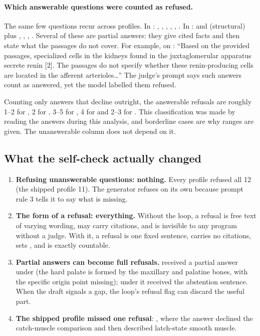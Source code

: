 \paragraph{Which answerable questions were counted as refused.} The same few questions recur across profiles. In : , , , , , . In :  and  (structural) plus , , , . Several of these are partial answers: they give cited facts and then state what the passages do not cover. For example,  on : \enquote{Based on the provided passages, specialized cells in the kidneys found in the juxtaglomerular apparatus secrete renin [2]. The passages do not specify whether these renin-producing cells are located in the afferent arterioles\ldots} The judge's prompt says such answers count as answered, yet the model labelled them refused.

\begin{inferred}
Counting only answers that decline outright, the answerable refusals are roughly 1--2 for , 2 for , 3--5 for , 4 for  and 2--3 for . This classification was made by reading the answers during this analysis, and borderline cases are why ranges are given. The unanswerable column does not depend on it.
\end{inferred}

\subsection{What the self-check actually changed}

\begin{enumerate}
  \item \textbf{Refusing unanswerable questions: nothing.} Every profile refused all 12 (the shipped profile 11). The generator refuses on its own because prompt rule 3 tells it to say what is missing.
  \item \textbf{The form of a refusal: everything.} Without the loop, a refusal is free text of varying wording, may carry citations, and is invisible to any program without a judge. With it, a refusal is one fixed sentence, carries no citations, sets , and is exactly countable.
  \item \textbf{Partial answers can become full refusals.}  received a partial answer under  (the hard palate is formed by the maxillary and palatine bones, with the specific origin point missing); under  it received the abstention sentence. When the draft signals a gap, the loop's refusal flag can discard the useful part.
  \item \textbf{The shipped profile missed one refusal}: , where the answer declined the catch-muscle comparison and then described latch-state smooth muscle.
\end{enumerate}

